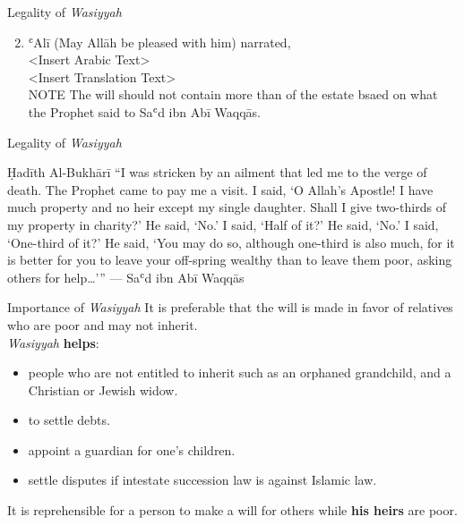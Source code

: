 \begin{frame}{Legality of \textit{Wasiyyah}}
\begin{enumerate}
\setcounter{enumi}{1}
\item ʿAlī (May Allāh be pleased with him) narrated,\\
<Insert Arabic Text>\\
<Insert Translation Text>\\
\alert{NOTE} The will should not contain more than  of the estate bsaed on what the Prophet \pbuh said to Saʿd ibn Abī Waqqās.
\end{enumerate}

\end{frame}

\begin{frame}{Legality of \textit{Wasiyyah}}
\begin{block}{Ḥadīth \hfill Al-Bukhārī}
“I was stricken by an ailment that led me to the verge of death. The Prophet \pbuh came to pay me a visit. I said, ‘O Allah's Apostle! I have much property and no heir except my single daughter. Shall I give two-thirds of my property in charity?’ He said, ‘No.’ I said, ‘Half of it?’ He said, ‘No.’ I said, ‘One-third of it?’ He said, ‘You may do so, although one-third is also much, for it is better for you to leave your off-spring wealthy than to leave them poor, asking others for help…’” \hfill --- Saʿd ibn Abī Waqqās
\end{block}
\end{frame}

\begin{frame}{Importance of \textit{Wasiyyah}}
It is preferable that the will is made in favor of relatives who are poor and may not inherit.\\[16pt]

\textit{Wasiyyah} \textbf{helps}:
\begin{itemize}
\item people who are not entitled to inherit such as an orphaned grandchild, and a Christian or Jewish widow.
\item to settle debts.
\item appoint a guardian for one's children.
\item settle disputes if intestate succession law is against Islamic law.
\end{itemize}

It is \alert{reprehensible} for a person to make a will for others while \textbf{his heirs} are poor.
\end{frame}

